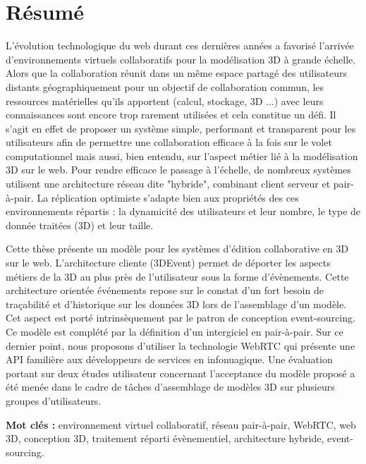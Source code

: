 \clearpage
\thispagestyle{empty}
\singlespacing
{\small
{\centering \section*{Résumé}}
\adjustmtc
{}

L’évolution technologique du web durant ces dernières années a favorisé l’arrivée 
d’environnements virtuels collaboratifs pour la modélisation 3D à grande échelle. 
Alors que la collaboration réunit dans un même espace partagé des utilisateurs 
distants géographiquement pour un objectif de collaboration commun, les 
ressources 
matérielles qu'ils apportent (calcul, stockage, 3D ...) avec leurs connaissances 
sont encore trop rarement utilisées et cela constitue un défi. Il s'agit en effet 
de proposer un système simple, performant et transparent pour les utilisateurs 
afin de permettre une collaboration efficace à la fois sur le volet computationnel 
mais aussi, bien entendu, sur l'aspect métier lié à la modélisation 3D sur le web.
Pour rendre efficace le passage à l’échelle, de nombreux systèmes utilisent une 
architecture réseau dite "hybride", combinant client serveur et pair-à-pair. La 
réplication optimiste s'adapte bien aux propriétés des ces environnements répartis 
: la dynamicité des utilisateurs et leur nombre, le type de donnée traitées (3D) 
et leur taille. 

Cette thèse présente un modèle pour les systèmes d’édition collaborative en 3D 
sur le web. L'architecture cliente (3DEvent) permet de déporter les 
aspects métiers de la 3D au plus près de l’utilisateur sous la forme d’évènements. 
Cette architecture orientée événements repose sur le constat 
d’un fort besoin de traçabilité et d’historique sur les données 3D lors de 
l’assemblage d’un modèle. Cet aspect est porté intrinsèquement par le patron de 
conception event-sourcing. Ce modèle est complété par la définition d’un 
intergiciel en pair-à-pair. Sur ce dernier point, nous proposons d'utiliser la 
technologie WebRTC qui présente une API familière aux développeurs de services 
en infonuagique. Une évaluation portant sur deux études utilisateur concernant 
l’acceptance du modèle proposé a été menée dans le cadre de tâches 
d’assemblage de 
modèles 3D sur plusieurs groupes d’utilisateurs.

\textbf{Mot clés : }environnement virtuel collaboratif, réseau pair-à-pair, WebRTC, 
web 3D, conception 3D, traitement réparti évènementiel, architecture hybride, 
event-sourcing.

}
